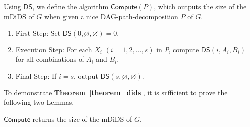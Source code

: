 \documentclass[runningheads]{llncs}
\theoremstyle{plain}
\theoremstyle{definition}
\begin{document}
Using $\mathsf{DS}$, we define the algorithm $\mathsf{Compute}(P)$, which outputs the size of the mDiDS of $G$ when given a nice DAG-path-decomposition $P$ of $G$.

\begin{enumerate}
    \item First Step: Set $\mathsf{DS}(0, \varnothing, \varnothing) = 0$.
    \item Execution Step: For each $X_i$ $(i=1, 2, ..., s)$ in $P$, compute $\mathsf{DS}(i, A_i, B_i)$ for all combinations of $A_i$ and $B_i$.
    \item Final Step: If $i = s$, output $\mathsf{DS}(s, \varnothing, \varnothing)$.
\end{enumerate}

To demonstrate \textbf{Theorem~\ref{theorem_dids}}, it is sufficient to prove the following two Lemmas.

\begin{lemma}\label{dids}
    $\mathsf{Compute}$ returns the size of the mDiDS of $G$.
\end{lemma}
\end{document}
